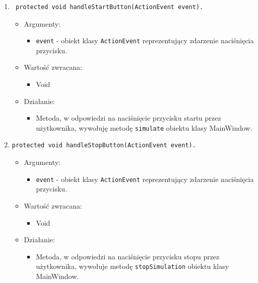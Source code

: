 \documentclass[a4paper,11pt, notitlepage ]{article}
\begin{document}
\begin{enumerate}
\item \begin{verbatim} protected void handleStartButton(ActionEvent event). \end{verbatim}
\begin{itemize}
\item Argumenty:
\begin{itemize}
\item \verb+event+ - obiekt klasy \verb+ActionEvent+ reprezentujący zdarzenie naciśnięcia przycisku.
\end{itemize}
\item Wartość zwracana:
\begin{itemize}
\item Void
\end{itemize}
\item Działanie:
\begin{itemize}
\item Metoda, w odpowiedzi na naciśnięcie przycisku startu przez użytkownika, wywołuję metodę \verb+simulate+ obiektu klasy MainWindow.
\end{itemize}
\end{itemize}


\item \begin{verbatim}protected void handleStopButton(ActionEvent event). \end{verbatim}
\begin{itemize}
\item Argumenty:
\begin{itemize}
\item \verb+event+ - obiekt klasy \verb+ActionEvent+ reprezentujący zdarzenie naciśnięcia przycisku.
\end{itemize}
\item Wartość zwracana:
\begin{itemize}
\item Void
\end{itemize}
\item Działanie:
\begin{itemize}
\item Metoda, w odpowiedzi na naciśnięcie przycisku stopu przez użytkownika, wywołuje metodę \verb+stopSimulation+ obiektu klasy MainWindow.
\end{itemize}
\end{itemize}



\end{enumerate}
\end{document}
